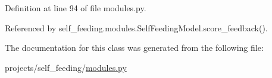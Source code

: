 Definition at line 94 of file modules.\+py.



Referenced by self\+\_\+feeding.\+modules.\+Self\+Feeding\+Model.\+score\+\_\+feedback().



The documentation for this class was generated from the following file\+:\begin{DoxyCompactItemize}
\item 
projects/self\+\_\+feeding/\hyperlink{projects_2self__feeding_2modules_8py}{modules.\+py}\end{DoxyCompactItemize}
